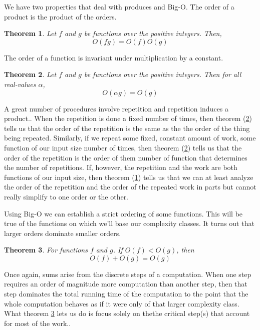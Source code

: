 \documentclass[]{tufte-handout}
\newtheorem{theorem}{Theorem}
\begin{document}
We have two properties that deal with produces and Big-O. The order of a product is the product of the orders.
\begin{theorem}
Let $f$ and $g$ be functions over the positive integers. Then,
\[
O(fg) = O(f)O(g)
\]
\label{th:mult}
\end{theorem}
The order of a function is invariant under multiplication by a constant.
\begin{theorem}
Let $f$ and $g$ be functions over the positive integers. Then for all real-values $\alpha$,
\[
O(\alpha g) = O(g)
\]
\label{th:constmult}
\end{theorem}
A great number of procedures involve repetition and repetition induces a product.. When the repetition is done a fixed number of times, then theorem (\ref{th:constmult}) tells us that the order of the repetition is the same as the the order of the thing being repeated. Similarly, if we repeat some fixed, constant amount of work, some function of our input size number of times, then theorem (\ref{th:constmult}) tells us that the order of the repetition is the order of them number of function that determines the number of repetitions. If, however, the repetition and the work are both functions of our input size, then theorem (\ref{th:mult}) tells us that we can at least analyze the order of the repetition and the order of the repeated work in parts but cannot really simplify to one order or the other. 


Using Big-O we can establish a strict ordering of some functions. This will be true of the functions on which we'll base our complexity classes. It turns out that larger orders dominate smaller orders. 
\begin{theorem}
For functions $f$ and $g$. If $O(f) < O(g)$, then
\[
O(f) + O(g) = O(g)
\]
\label{th:order}
\end{theorem}
Once again, sums arise from the discrete steps of a computation. When one step requires an order of magnitude more computation than another step, then that step dominates the total running time of the computation to the point that the whole computation behaves as if it were only of that larger complexity class. What theorem \ref{th:order} lets us do is focus solely on thethe critical step(s) that account for most of the work.. 
\end{document}
